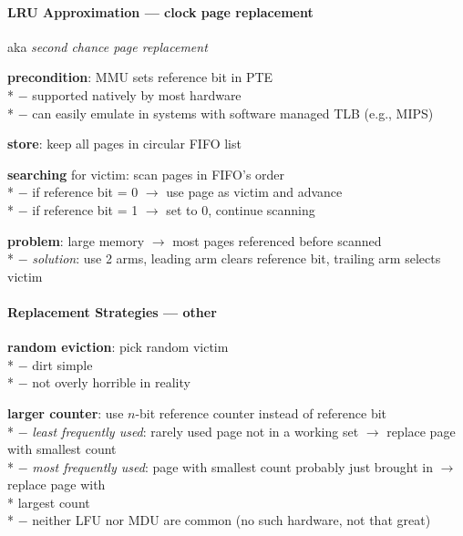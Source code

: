 \paragraph{LRU Approximation --- clock page replacement}
\begin{items}
  \item aka \emph{second chance page replacement}
  \item \textbf{precondition}: MMU sets reference bit in PTE \\*
    $ - $ supported natively by most hardware \\*
    $ - $ can easily emulate in systems with software managed TLB (e.g., MIPS)
  \item \textbf{store}: keep all pages in circular FIFO list
  \item \textbf{searching} for victim: scan pages in FIFO's order \\*
    $ - $ if reference bit = 0 $ \to $ use page as victim and advance \\*
    $ - $ if reference bit = 1 $ \to $ set to 0, continue scanning
  \item \textbf{problem}: large memory $ \to $ most pages referenced before scanned \\*
    $ - $ \emph{solution}: use 2 arms, leading arm clears reference bit, trailing arm selects victim
\end{items}

\paragraph{Replacement Strategies --- other}
\begin{items}
  \item \textbf{random eviction}: pick random victim \\*
    $ - $ dirt simple \\*
    $ - $ not overly horrible in reality
  \item \textbf{larger counter}: use $ n $-bit reference counter instead of reference bit \\*
    $ - $ \emph{least frequently used}: rarely used page not in a working set $ \to $ replace page with smallest count \\*
    $ - $ \emph{most frequently used}: page with smallest count probably just brought in $ \to $ replace page with \\* \phantom{$ - $} \phantom{$ \cdot $} largest count \\*
    $ - $ neither LFU nor MDU are common (no such hardware, not that great)
\end{items}

